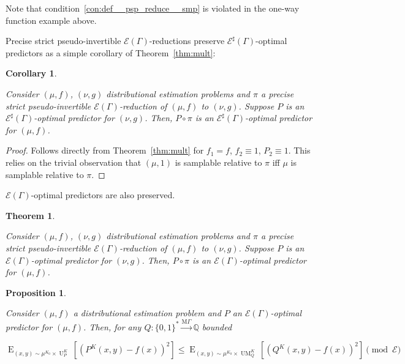 \documentclass{article}
\numberwithin{equation}{section}
\theoremstyle{definition}
\theoremstyle{plain}
\newtheorem{theorem}{Theorem}[section]
\newtheorem{proposition}{Proposition}[section]
\newtheorem{corollary}{Corollary}[section]
\newcommand{\Bool}{\{0,1\}}
\newcommand{\Words}{{\Bool^*}}
\DeclareMathOperator{\E}{E}
\DeclareMathOperator{\UM}{UM}
\DeclareMathOperator{\Un}{U}
\newcommand{\Rats}{\mathbb{Q}}
\newcommand{\MGrow}{\mathrm{M}\Gamma}
\newcommand{\Fall}{\mathcal{E}}
\newcommand{\EG}{\Fall(\Gamma)}
\newcommand{\ESG}{\Fall^\sharp(\Gamma)}
\newcommand{\MScheme}{\xrightarrow{\MGrow}}
\begin{document}
Note that condition~\ref{con:def__psp_reduce__smp} is violated in the one-way function example above.

Precise strict pseudo-invertible $\EG$-reductions preserve $\ESG$-optimal predictors as a simple corollary of Theorem~\ref{thm:mult}:

\begin{samepage}
\begin{corollary}
\label{crl:psp_reduce_sharp}

Consider $(\mu,f)$, $(\nu,g)$ distributional estimation problems and $\pi$ a precise strict pseudo-invertible $\EG$-reduction of $(\mu, f)$ to $(\nu, g)$. Suppose $P$ is an $\ESG$-optimal predictor for $(\nu, g)$. Then, $P \circ \pi$ is an $\ESG$-optimal predictor for $(\mu, f)$.

\end{corollary}
\end{samepage}

\begin{proof}

Follows directly from Theorem~\ref{thm:mult} for $f_1 = f$, ${f_2 \equiv 1}$, $P_2 \equiv 1$. This relies on the trivial observation that $(\mu, 1)$ is samplable relative to $\pi$ iff $\mu$ is samplable relative to $\pi$.
%
\end{proof}

$\EG$-optimal predictors are also preserved.

\begin{samepage}
\begin{theorem}
\label{thm:psp_reduce}

Consider $(\mu,f)$, $(\nu,g)$ distributional estimation problems and $\pi$ a precise strict pseudo-invertible $\EG$-reduction of $(\mu, f)$ to $(\nu, g)$. Suppose $P$ is an $\EG$-optimal predictor for $(\nu, g)$. Then, $P \circ \pi$ is an $\EG$-optimal predictor for $(\mu, f)$.

\end{theorem}
\end{samepage}

\begin{samepage}
\begin{proposition}
\label{prp:mixed_opt}

Consider ${(\mu,f)}$ a distributional estimation problem and ${P}$ an ${\EG}$-optimal predictor for ${(\mu,f)}$. Then, for any $Q: \Words \MScheme \Rats$ bounded

\begin{equation}
\label{eqn:prp__mixed_ort}
\E_{(x,y) \sim \mu^{K_0} \times \Un_P^K}[(P^K(x,y) - f(x))^2] \leq \E_{(x,y) \sim \mu^{K_0} \times \UM_Q^K}[(Q^K(x,y)-f(x))^2] \pmod \Fall
\end{equation}

\end{proposition}
\end{samepage}
\end{document}
